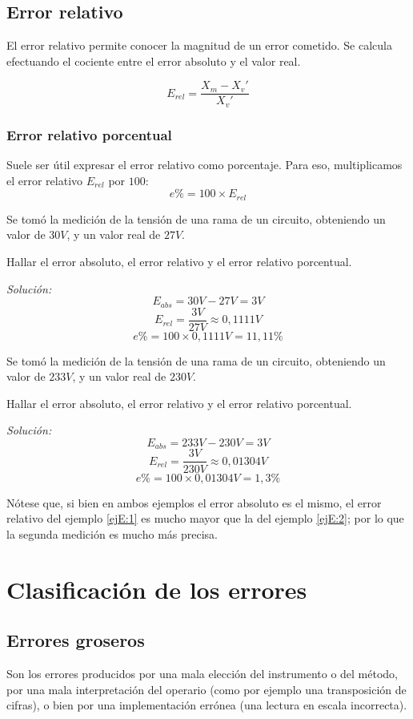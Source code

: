 \subsection{Error relativo}

El error relativo permite conocer la magnitud de un error cometido. Se calcula efectuando el cociente entre el error absoluto y el valor real.

$$ E_{rel} = \frac{X_m-X_v'}{X_v'} $$

\subsubsection{Error relativo porcentual}

Suele ser útil expresar el error relativo como porcentaje. Para eso, multiplicamos el error relativo $E_{rel}$ por $100$: $$ e\% = 100 \times E_{rel} $$

\begin{ejemplo} \label{ejE:1}
	Se tomó la medición de la tensión de una rama de un circuito, obteniendo un valor de $30 V$, y un valor real de $27 V$.
	
	Hallar el error absoluto, el error relativo y el error relativo porcentual.
	
	\emph{Solución:} $$ E_{abs}= 30 V-27 V = 3 V $$ 
	$$ E_{rel} = \frac{3 V}{27 V} \approx 0,1111 V$$
	$$ e\% = 100 \times 0,1111 V = 11,11 \% $$
\end{ejemplo}

\begin{ejemplo}
	\label{ejE:2}
	Se tomó la medición de la tensión de una rama de un circuito, obteniendo un valor de $233 V$, y un valor real de $230 V$.
	
	Hallar el error absoluto, el error relativo y el error relativo porcentual.
	
	\emph{Solución:} $$ E_{abs}= 233 V- 230 V = 3 V $$ 
	$$ E_{rel} = \frac{3 V}{230 V} \approx 0,01304 V$$
	$$ e\% = 100 \times 0,01304 V = 1,3 \% $$
\end{ejemplo}

Nótese que, si bien en ambos ejemplos el error absoluto es el mismo, el error relativo del ejemplo \ref{ejE:1} es mucho mayor que la del ejemplo \ref{ejE:2}; por lo que la segunda medición es mucho más precisa.

\section{Clasificación de los errores}
\subsection{Errores groseros}
Son los errores producidos por una mala elección del instrumento o del método, por una mala interpretación del operario (como por ejemplo una transposición de cifras), o bien por una implementación errónea (una lectura en escala incorrecta).

